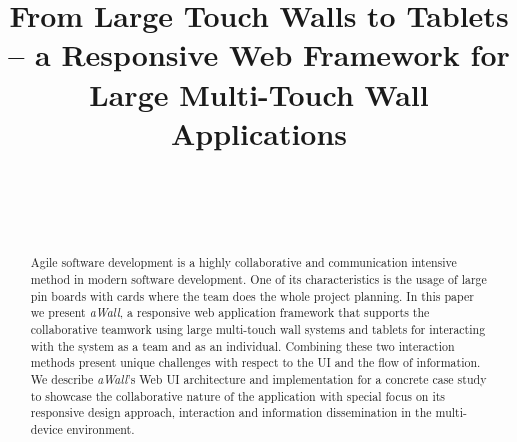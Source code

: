 \documentclass{sigchi}
\begin{document}
\title{From Large Touch Walls to Tablets -- a Responsive Web Framework for Large Multi-Touch Wall Applications}

\author{%
  \\
  \\
  \\
}

\maketitle



\begin{abstract}
Agile software development is a highly collaborative and communication intensive method in modern software development.  One of its characteristics is the usage of large pin boards with cards where the team does the whole project planning. In this paper we present \textit{aWall}, a responsive web application framework that supports the collaborative teamwork using large multi-touch wall systems and tablets for interacting with the system as a team and as an individual. Combining these two interaction methods present unique challenges with respect to the UI and the flow of information. We describe \textit{aWall}'s Web UI architecture and implementation for a concrete case study to showcase the collaborative nature of the application with special focus on its responsive design approach, interaction and information dissemination in the multi-device environment.
\end{abstract}
\end{document}
